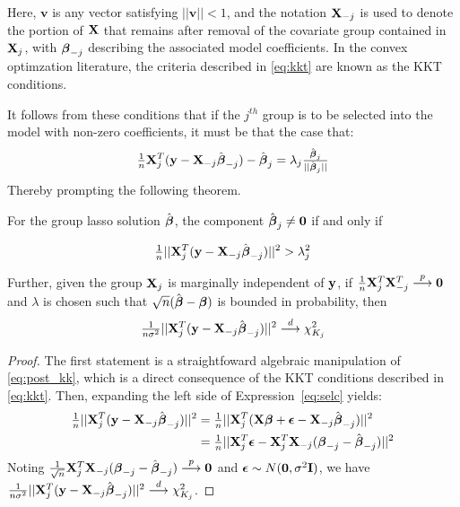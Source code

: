 Here, $\mathbf{v}$ is any vector satisfying $||\mathbf{v}|| < 1$, and the notation $\mathbf{X}_{-j}$ is used to denote the portion of $\mathbf{X}$ that remains after removal of the covariate group contained in $\mathbf{X}_j$, with $\boldsymbol{\beta}_{-j}$ describing the associated model coefficients.  In the convex optimzation literature, the criteria described in \ref{eq:kkt} are known as the KKT conditions.  

It follows from these conditions that if the $j^{th}$ group is to be selected into the model with non-zero coefficients, it must be that the case that:
\begin{equation}
  \label{eq:post_ktt}
\tfrac{1}{n}\mathbf{X}_j^T(\mathbf{y} - \mathbf{X}_{-j}\hat{\boldsymbol{\beta}}_{-j}) - \hat{\boldsymbol{\beta}}_j = \lambda_j\tfrac{\hat{\boldsymbol{\beta}}_j}{||\hat{\boldsymbol{\beta}}_j||}
\end{equation}
Thereby prompting the following theorem.

\begin{theorem}
\label{Thm:main}
For the group lasso solution $\hat{\boldsymbol{\beta}}$, the component $\hat{\boldsymbol{\beta}}_j \ne \mathbf{0}$ if and only if

\begin{equation}
  \label{eq:selc}
\tfrac{1}{n}||\mathbf{X}_j^T(\mathbf{y} - \mathbf{X}_{-j}\hat{\boldsymbol{\beta}}_{-j})||^2 > \lambda_j^2
\end{equation}

Further, given the group $\mathbf{X}_j$ is marginally independent of $\mathbf{y}$, if $\tfrac{1}{n}\mathbf{X}_j^T \mathbf{X}_{-j}^T \overset{p}{\longrightarrow} \mathbf{0}$ and $\lambda$ is chosen such that $\sqrt{n}(\hat{\boldsymbol{\beta}} -  \boldsymbol{\beta})$ is bounded in probability, then
\begin{equation}
  \label{eq:thm1}
  \tfrac{1}{n \sigma^2}||\mathbf{X}_j^T(\mathbf{y} - \mathbf{X}_{-j}\hat{\boldsymbol{\beta}}_{-j})||^2 \overset{d}{\longrightarrow} \chi^2_{K_j}
\end{equation}
\end{theorem}

\begin{proof}
The first statement is a straightfoward algebraic manipulation of \ref{eq:post_kk}, which is a direct consequence of the KKT conditions described in \ref{eq:kkt}.  Then, expanding the left side of Expression~\ref{eq:selc} yields:
\begin{align}
\begin{alignedat}{2}
\tfrac{1}{n}||\mathbf{X}_j^T(\mathbf{y} - \mathbf{X}_{-j}\hat{\boldsymbol{\beta}}_{-j})||^2 &= \tfrac{1}{n}||\mathbf{X}_j^T(\mathbf{X}\boldsymbol{\beta} + \boldsymbol{\epsilon} - \mathbf{X}_{-j}\hat{\boldsymbol{\beta}}_{-j})||^2 \\
                                                     &= \tfrac{1}{n}||\mathbf{X}_j^T\boldsymbol{\epsilon} - \mathbf{X}_j^T\mathbf{X}_{-j}(\boldsymbol{\beta}_{-j} - \hat{\boldsymbol{\beta}}_{-j})||^2 
\end{alignedat}
\end{align}
Noting $\tfrac{1}{\sqrt{n}} \mathbf{X}_j^T\mathbf{X}_{-j}(\boldsymbol{\beta}_{-j} - \hat{\boldsymbol{\beta}}_{-j}) \overset{p}{\longrightarrow} \mathbf{0}$ and $\boldsymbol{\epsilon} \sim N(\mathbf{0},\sigma^2\mathbf{I})$, we have $\tfrac{1}{n \sigma^2}||\mathbf{X}_j^T(\mathbf{y} - \mathbf{X}_{-j}\hat{\boldsymbol{\beta}}_{-j})||^2 \overset{d}{\longrightarrow} \chi^2_{K_j}$.
\end{proof}

